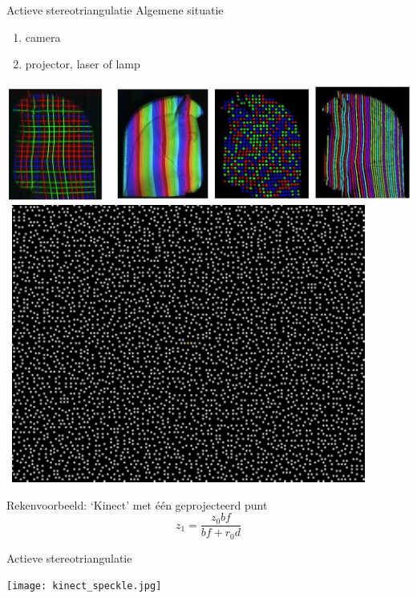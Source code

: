 \documentclass{beamer}
\begin{document}
\begin{frame}{Actieve stereotriangulatie}{}
{\large Algemene situatie}
\begin{enumerate}
\item camera
\item projector, laser of lamp
\end{enumerate}
\vfill
\pause
\centerline{\includegraphics[scale=0.17]{structuredlight.jpg}\, \includegraphics[scale=1, clip=true, viewport= 0 0 80 63]{kinect-pattern}}
\vfill
\pause
{\large Rekenvoorbeeld: `Kinect' met \'e\'en geprojecteerd punt}
\pause
$$
z_1 = \frac {z_0bf}{bf + r_0d}
$$
\end{frame}

\begin{frame}{Actieve stereotriangulatie}\vspace{-4pt}
\centerline{\texttt{[image: kinect\_speckle.jpg]}}
\end{frame}

\end{document}
